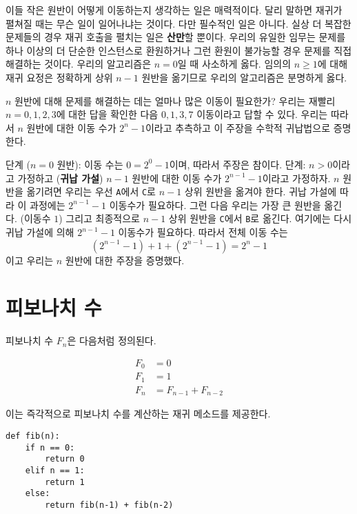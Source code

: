 \documentclass[a4paper]{oblivoir}
\begin{document}
이들 작은 원반이 어떻게 이동하는지 생각하는 일은 매력적이다. 달리 말하면 재귀가 펼쳐질 때는 무슨 일이 일어나냐는 것이다. 다만 필수적인 일은 아니다. 실상 더 복잡한 문제들의 경우 재귀 호출을 펼치는 일은 \textbf{산만}할 뿐이다. 우리의 유일한 임무는 문제를 하나 이상의 더 단순한 인스턴스로 환원하거나 그런 환원이 불가능할 경우 문제를 직접 해결하는 것이다. 우리의 알고리즘은 $n=0$일 때 사소하게 옳다. 임의의 $n\geq 1$에 대해 재귀 요정은 정확하게 상위 $n-1$ 원반을 옮기므로 우리의 알고리즘은 분명하게 옳다.

$n$ 원반에 대해 문제를 해결하는 데는 얼마나 많은 이동이 필요한가? 우리는 재빨리 $n=0,1,2,3$에 대한 답을 확인한 다음 $0,1,3,7$ 이동이라고 답할 수 있다. 우리는 따라서 $n$ 원반에 대한 이동 수가 $2^n-1$이라고 추측하고 이 주장을 수학적 귀납법으로 증명한다.

\begin{itemize}
     단계 ($n=0$ 원반): 이동 수는 $0=2^0-1$이며, 따라서 주장은 참이다.
     단계: $n>0$이라고 가정하고 (\textbf{귀납 가설}) $n-1$ 원반에 대한 이동 수가 $2^{n-1}-1$이라고 가정하자. $n$ 원반을 옮기려면 우리는 우선 \texttt{A}에서 \texttt{C}로 $n-1$ 상위 원반을 옮겨야 한다. 귀납 가설에 따라 이 과정에는 $2^{n-1}-1$ 이동수가 필요하다. 그런 다음 우리는 가장 큰 원반을 옮긴다. (이동수 $1$) 그리고 최종적으로 $n-1$ 상위 원반을 \texttt{C}에서 \texttt{B}로 옮긴다. 여기에는 다시 귀납 가설에 의해 $2^{n-1}-1$ 이동수가 필요하다. 따라서 전체 이동 수는 $$(2^{n-1}-1)+1+(2^{n-1}-1)=2^n-1$$이고 우리는 $n$ 원반에 대한 주장을 증명했다.
\end{itemize}

\section*{피보나치 수}
피보나치 수 $F_n$은 다음처럼 정의된다.

$$\begin{aligned}F_0&=0\\ 
F_1&=1\\ 
F_n&=F_{n-1}+F_{n-2}\end{aligned}$$

이는 즉각적으로 피보나치 수를 계산하는 재귀 메소드를 제공한다.

\begin{verbatim}
def fib(n):
	if n == 0:
		return 0
	elif n == 1:
		return 1
	else:
		return fib(n-1) + fib(n-2)
\end{verbatim}
\end{document}
